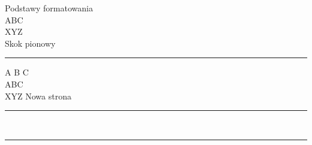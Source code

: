 \documentclass[12pt]{article}
\begin{document}
Podstawy formatowania
\\
ABC\\[16pt]
XYZ
\\[32pt]
Skok pionowy
\hrule
\noindent %
A                           B                                                           C
\\
A\hspace{32pt}B\hspace{128pt}C
\vspace{32pt}\\
XYZ
\newpage
Nowa strona\\
\rule{32pt}{4pt}\\
\rule{\textwidth}{41pt}
\end{document}
